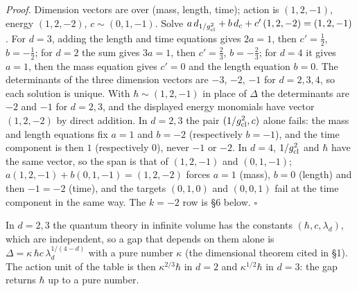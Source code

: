 \documentclass[11pt,a4paper]{article}
\begin{document}
\emph{Proof.} Dimension vectors are over (mass, length, time); action is
\((1,2,-1)\), energy \((1,2,-2)\), \(c\sim(0,1,-1)\). Solve
\(a\,d_{1/g_{\rm cl}^2}+b\,d_c+c'\,(1,2,-2)=(1,2,-1)\). For \(d=3\),
adding the length and time equations gives \(2a=1\), then
\(c'=\tfrac12\), \(b=-\tfrac12\); for \(d=2\) the sum gives \(3a=1\),
then \(c'=\tfrac23\), \(b=-\tfrac23\); for \(d=4\) it gives \(a=1\),
then the mass equation gives \(c'=0\) and the length equation \(b=0\).
The determinants of the three dimension vectors are \(-3\), \(-2\),
\(-1\) for \(d=2,3,4\), so each solution is unique. With
\(\hbar\sim(1,2,-1)\) in place of \(\Delta\) the determinants are \(-2\)
and \(-1\) for \(d=2,3\), and the displayed energy monomials have vector
\((1,2,-2)\) by direct addition. In \(d=2,3\) the pair
\((1/g_{\rm cl}^2,c)\) alone fails: the mass and length equations fix
\(a=1\) and \(b=-2\) (respectively \(b=-1\)), and the time component is
then \(1\) (respectively \(0\)), never \(-1\) or \(-2\). In \(d=4\),
\(1/g_{\rm cl}^2\) and \(\hbar\) have the same vector, so the span is
that of \((1,2,-1)\) and \((0,1,-1)\); \(a(1,2,-1)+b(0,1,-1)=(1,2,-2)\)
forces \(a=1\) (mass), \(b=0\) (length) and then \(-1=-2\) (time), and
the targets \((0,1,0)\) and \((0,0,1)\) fail at the time component in
the same way. The \(k=-2\) row is §6 below. \(\square\)

In \(d=2,3\) the quantum theory in infinite volume has the constants
\((\hbar,c,\lambda_d)\), which are independent, so a gap that depends on
them alone is \(\Delta=\kappa\,\hbar c\,\lambda_d^{1/(4-d)}\) with a
pure number \(\kappa\) (the dimensional theorem cited in §1). The action
unit of the table is then \(\kappa^{2/3}\hbar\) in \(d=2\) and
\(\kappa^{1/2}\hbar\) in \(d=3\): the gap returns \(\hbar\) up to a pure
number.
\end{document}

